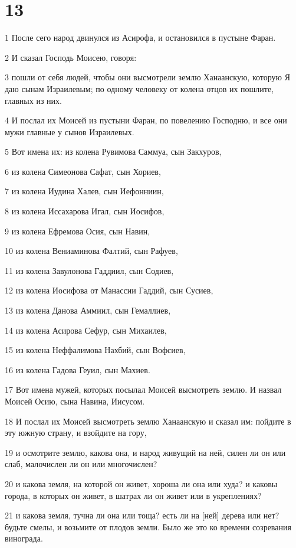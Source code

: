\chapter{13}

\par 1 После сего народ двинулся из Асирофа, и остановился в пустыне Фаран.
\par 2 И сказал Господь Моисею, говоря:
\par 3 пошли от себя людей, чтобы они высмотрели землю Ханаанскую, которую Я даю сынам Израилевым; по одному человеку от колена отцов их пошлите, главных из них.
\par 4 И послал их Моисей из пустыни Фаран, по повелению Господню, и все они мужи главные у сынов Израилевых.
\par 5 Вот имена их: из колена Рувимова Саммуа, сын Закхуров,
\par 6 из колена Симеонова Сафат, сын Хориев,
\par 7 из колена Иудина Халев, сын Иефонниин,
\par 8 из колена Иссахарова Игал, сын Иосифов,
\par 9 из колена Ефремова Осия, сын Навин,
\par 10 из колена Вениаминова Фалтий, сын Рафуев,
\par 11 из колена Завулонова Гаддиил, сын Содиев,
\par 12 из колена Иосифова от Манассии Гаддий, сын Сусиев,
\par 13 из колена Данова Аммиил, сын Гемаллиев,
\par 14 из колена Асирова Сефур, сын Михаилев,
\par 15 из колена Неффалимова Нахбий, сын Вофсиев,
\par 16 из колена Гадова Геуил, сын Махиев.
\par 17 Вот имена мужей, которых посылал Моисей высмотреть землю. И назвал Моисей Осию, сына Навина, Иисусом.
\par 18 И послал их Моисей высмотреть землю Ханаанскую и сказал им: пойдите в эту южную страну, и взойдите на гору,
\par 19 и осмотрите землю, какова она, и народ живущий на ней, силен ли он или слаб, малочислен ли он или многочислен?
\par 20 и какова земля, на которой он живет, хороша ли она или худа? и каковы города, в которых он живет, в шатрах ли он живет или в укреплениях?
\par 21 и какова земля, тучна ли она или тоща? есть ли на [ней] дерева или нет? будьте смелы, и возьмите от плодов земли. Было же это ко времени созревания винограда.
